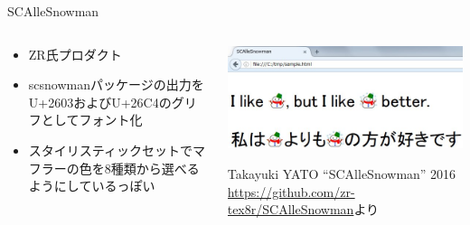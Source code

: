 \documentclass[unicode,14pt]{beamer}
\begin{document}
\begin{frame}[t]{SCAlleSnowman}
  \sffamily
  \begin{columns}[t]
    \begin{column}{.5\textwidth}
  \begin{itemize}
\item ZR氏プロダクト
\item scsnowmanパッケージの出力をU+2603およびU+26C4のグリフとしてフォント化
\item スタイリスティックセットでマフラーの色を8種類から選べるようにしているっぽい
  \end{itemize}
    \end{column}
    \begin{column}{.5\textwidth}
  \begin{center}
    \includegraphics[width=\textwidth]{figures/sallesnowmen.jpg}
  \end{center}
  \raggedleft\tiny\color{50gray} Takayuki YATO
``SCAlleSnowman'' 2016
  \url{https://github.com/zr-tex8r/SCAlleSnowman}より
    \end{column}
  \end{columns}
\end{frame}
\end{document}
